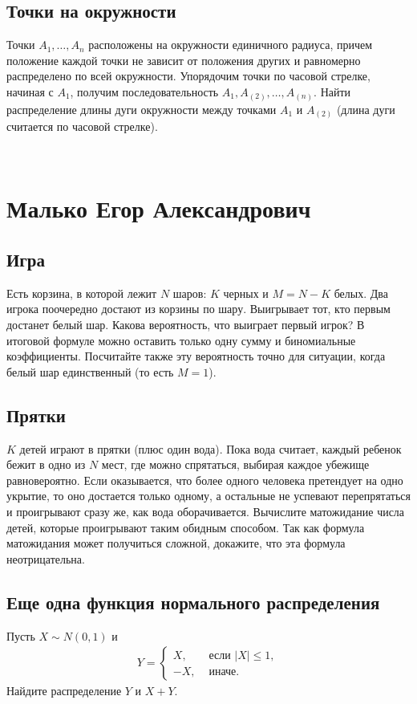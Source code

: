 \documentclass[12pt]{article}
\begin{document}
\subsection{Точки на окружности}
Точки $A_1, \dots, A_n$ расположены на окружности единичного радиуса, причем положение каждой точки не зависит от положения других и равномерно распределено по всей окружности. Упорядочим точки по часовой стрелке, начиная с $A_1$, получим последовательность $A_1, A_{(2)}, \dots, A_{(n)}$. Найти распределение длины дуги окружности между точками $A_1$ и $A_{(2)}$ (длина дуги считается по часовой стрелке).

\newpage
~
\newpage
\section{Малько Егор Александрович}

\subsection{Игра}
Есть корзина, в которой лежит $N$ шаров: $K$ черных и $M = N - K$ белых. Два игрока поочередно достают из корзины по шару. Выигрывает тот, кто первым достанет белый шар. Какова вероятность, что выиграет первый игрок? В итоговой формуле можно оставить только одну сумму и биномиальные коэффициенты. Посчитайте также эту вероятность точно для ситуации, когда белый шар единственный (то есть $M = 1$).

\subsection{Прятки}
$K$ детей играют в прятки (плюс один вода). Пока вода считает, каждый ребенок бежит в одно из $N$ мест, где можно спрятаться, выбирая каждое убежище равновероятно. Если оказывается, что более одного человека претендует на одно укрытие, то оно достается только одному, а остальные не успевают перепрятаться и проигрывают сразу же, как вода оборачивается. Вычислите матожидание числа детей, которые проигрывают таким обидным способом. Так как формула матожидания может получиться сложной, докажите, что эта формула неотрицательна.

\subsection{Еще одна функция нормального распределения}
Пусть $X \sim N(0, 1)$ и 
\begin{align*}
    Y = \begin{cases}
        X, &\text{ если } |X| \le 1, \\
        -X, &\text{ иначе.}
    \end{cases}
\end{align*}
Найдите распределение $Y$ и $X + Y$.
\end{document}
